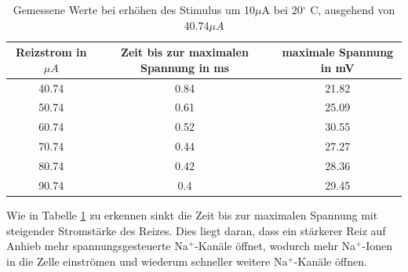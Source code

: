 \documentclass[11pt]{article}
\begin{document}
\begin{table}[H]
\caption{Gemessene Werte bei erhöhen des Stimulus um 10$\mu$A bei 20$^\circ$ C, ausgehend von $40.74\mu A$}
\centering
\begin{adjustbox}{width=1.3\textwidth, center=\textwidth}
\begin{tabular}{c|c|c}
Reizstrom in $\mu A$ & Zeit bis zur maximalen Spannung in ms & maximale Spannung in mV \\
\hline\hline
40.74 & 0.84 & 21.82\\
50.74 & 0.61 & 25.09\\
60.74 & 0.52 & 30.55\\
70.74 & 0.44 & 27.27\\
80.74 & 0.42 & 28.36\\
90.74 & 0.4 & 29.45\\
\end{tabular}
\end{adjustbox}
\label{werte223}
\end{table} 

Wie in Tabelle \ref{werte223}  zu erkennen  sinkt die Zeit bis zur maximalen Spannung mit steigender Stromstärke des Reizes. Dies liegt daran, dass ein stärkerer Reiz auf Anhieb mehr spannungsgesteuerte Na$^+$-Kanäle öffnet, wodurch mehr Na$^+$-Ionen in die Zelle einströmen und wiederum schneller weitere Na$^+$-Kanäle öffnen. 
\end{document}
